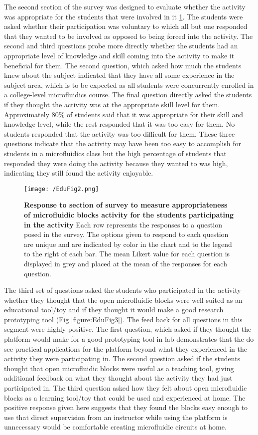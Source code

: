 The second section of the survey was designed to evaluate whether the activity was appropriate for the students that were involved in it \ref{figure:EduFig2}. The students were asked whether their participation was voluntary to which all but one responded that they wanted to be involved as opposed to being forced into the activity. The second and third questions probe more directly whether the students had an appropriate level of knowledge and skill coming into the activity to make it beneficial for them. The second question, which asked how much the students knew about the subject indicated that they have all some experience in the subject area, which is to be expected as all students were concurrently enrolled in a college-level microfluidics course. The final question directly asked the students if they thought the activity was at the appropriate skill level for them. Approximately 80\% of students said that it was appropriate for their skill and knowledge level, while the rest responded that it was too easy for them. No students responded that the activity was too difficult for them. These three questions indicate that the activity may have been too easy to accomplish for students in a microfluidics class but the high percentage of students that responded they were doing the activity because they wanted to was high, indicating they still found the activity enjoyable. 

\begin{figure}[h!] %
\centering
\texttt{[image: /EduFig2.png]}
\caption{\textbf{Response to section of survey to measure appropriateness of microfluidic blocks activity for the students participating in the activity} Each row represents the responses to a question posed in the survey. The options given to respond to each question are unique and are indicated by color in the chart and to the legend to the right of each bar. The mean Likert value for each question is displayed in grey and placed at the mean of the responses for each question.}
\label{figure:EduFig2}
\end{figure}


The third set of questions asked the students who participated in the activity whether they thought that the open microfluidic blocks were well suited as an educational tool/toy and if they thought it would make a good research prototyping tool (Fig \ref{figure:EduFig3}). The feed back for all questions in this segment were highly positive. The first question, which asked if they thought the platform would make for a good prototyping tool in lab demonstrates that the do see practical applications for the platform beyond what they experienced in the activity they were participating in. The second question asked if the students thought that open microfluidic blocks were useful as a teaching tool, giving additional feedback on what they thought about the activity they had just participated in. The third question asked how they felt about open microfluidic blocks as a learning tool/toy that could be used and experienced at home. The positive response given here suggests that they found the blocks easy enough to use that direct supervision from an instructor while using the platform is unnecessary would be comfortable creating microfluidic circuits at home.

